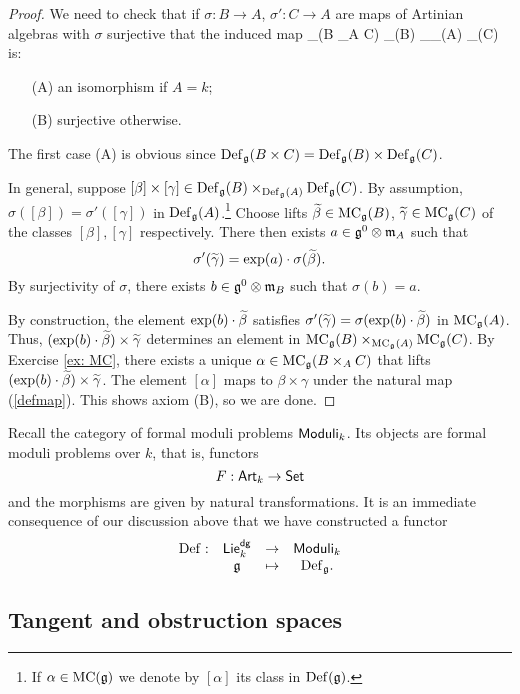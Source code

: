 \documentclass[11pt]{amsart}
\def\dgLie{{\sf Lie}^{\sf dg}}
\def\Moduli{{\sf Moduli}}
\begin{document}
\begin{proof}
We need to check that if $\sigma : B \to A$, $\sigma' : C \to A$ are maps of Artinian algebras with $\sigma$ surjective that the induced map
\beqn\label{defmap}
\Def_\fg (B \times_A C) \to \Def_\fg(B) \times_{\Def_\fg(A)} \Def_\fg(C)
\eeqn
is:
\begin{itemize}
\item[(A)] an isomorphism if $A = k$;
\item[(B)] surjective otherwise. 
\end{itemize} 
The first case (A) is obvious since $\Def_\fg(B \times C) = \Def_{\fg}(B) \times \Def_\fg(C)$. 

In general, suppose $[\beta] \times [\gamma] \in \Def_\fg(B) \times_{\Def_\fg(A)} \Def_\fg(C)$.
By assumption, $\sigma([\beta]) = \sigma'([\gamma])$ in $\Def_\fg(A)$.\footnote{If $\alpha \in \MC(\fg)$ we denote by $[\alpha]$ its class in $\Def(\fg)$.}
Choose lifts $\Tilde{\beta} \in \MC_\fg (B)$, $\Tilde{\gamma} \in \MC_\fg(C)$ of the classes $[\beta], [\gamma]$ respectively.
There then exists $a \in \fg^0 \tensor \fm_A$ such that 
\[
\sigma'(\Tilde{\gamma}) = \exp(a) \cdot \sigma(\Tilde{\beta}) .
\] 
By surjectivity of $\sigma$, there exists $b \in \fg^0 \tensor \fm_B$ such that $\sigma(b) = a$. 

By construction, the element $\exp(b) \cdot \Tilde{\beta}$ satisfies $\sigma'(\Tilde{\gamma}) = \sigma(\exp(b) \cdot \Tilde{\beta})$ in $\MC_\fg(A)$. 
Thus, $(\exp(b) \cdot \Tilde{\beta}) \times \Tilde{\gamma}$ determines an element in $\MC_\fg(B) \times_{\MC_\fg(A)} \MC_\fg(C)$.
By Exercise \ref{ex: MC}, there exists a unique $\alpha \in \MC_\fg (B \times_A C)$ that lifts $(\exp(b) \cdot \Tilde{\beta}) \times \Tilde{\gamma}$. 
The element $[\alpha]$ maps to $\beta \times \gamma$ under the natural map (\ref{defmap}).
This shows axiom (B), so we are done. 
\end{proof}

Recall the category of formal moduli problems $\Moduli_k$. 
Its objects are formal moduli problems over $k$, that is, functors
\[
F : \Art_k \to \Set
\]
and the morphisms are given by natural transformations. 
It is an immediate consequence of our discussion above that we have constructed a functor
\[
\begin{array}{cccc}
\Def : & \dgLie_k & \to & \Moduli_k \\
& \fg & \mapsto & \Def_\fg .
\end{array}
\] 

\subsection{Tangent and obstruction spaces}
\end{document}
